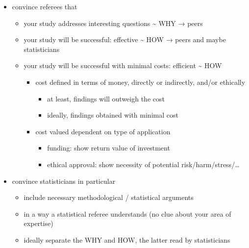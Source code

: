 \documentclass[
]{article}
\providecommand{\tightlist}{%
  \setlength{\itemsep}{0pt}\setlength{\parskip}{0pt}}
\begin{document}
\begin{itemize}
\tightlist
\item
  convince referees that

  \begin{itemize}
  \tightlist
  \item
    your study addresses interesting questions \textasciitilde{} WHY →
    peers
  \item
    your study will be successful: effective \textasciitilde{} HOW →
    peers and maybe statisticians
  \item
    your study will be successful with minimal costs: efficient
    \textasciitilde{} HOW

    \begin{itemize}
    \tightlist
    \item
      cost defined in terms of money, directly or indirectly, and/or
      ethically

      \begin{itemize}
      \tightlist
      \item
        at least, findings will outweigh the cost
      \item
        ideally, findings obtained with minimal cost
      \end{itemize}
    \item
      cost valued dependent on type of application

      \begin{itemize}
      \tightlist
      \item
        funding: show return value of investment
      \item
        ethical approval: show necessity of potential
        risk/harm/stress/\ldots{} \\
      \end{itemize}
    \end{itemize}
  \end{itemize}
\item
  convince statisticians in particular

  \begin{itemize}
  \tightlist
  \item
    include necessary methodological / statistical arguments
  \item
    in a way a statistical referee understands (no clue about your area
    of expertise)
  \item
    ideally separate the WHY and HOW, the latter read by statisticians
  \end{itemize}
\end{itemize}
\end{document}
